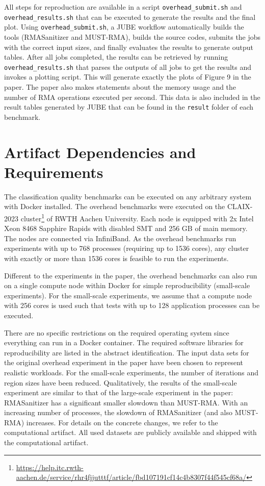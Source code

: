 \documentclass[twoside]{article}
\begin{document}
All steps for reproduction are available in a script \texttt{overhead\_submit.sh} and \texttt{overhead\_results.sh} that can be executed to generate the results and the final plot.
Using \texttt{overhead\_submit.sh}, a JUBE workflow automatically builds the tools (RMASanitizer and MUST-RMA), builds the source codes, submits the jobs with the correct input sizes, and finally evaluates the results to generate output tables.
After all jobs completed, the results can be retrieved by running \texttt{overhead\_results.sh} that parses the outputs of all jobs to get the results and invokes a plotting script.
This will generate exactly the plots of Figure 9 in the paper.
The paper also makes statements about the memory usage and the number of RMA operations executed per second.
This data is also included in the result tables generated by JUBE that can be found in the \texttt{result} folder of each benchmark.



\section*{Artifact Dependencies and Requirements}

The classification quality benchmarks can be executed on any arbitrary system with Docker installed.
The overhead benchmarks were executed on the CLAIX-2023 cluster\footnote{\url{https://help.itc.rwth-aachen.de/service/rhr4fjjutttf/article/fbd107191cf14c4b8307f44f545cf68a/}} of RWTH Aachen University. Each node is equipped with 2x Intel Xeon 8468 Sapphire Rapids with disabled SMT and 256 GB of main memory. The nodes are connected via InfiniBand. As the overhead benchmarks run experiments with up to 768 processes (requiring up to 1536 cores), any cluster with exactly or more than 1536 cores is feasible to run the experiments.

Different to the experiments in the paper, the overhead benchmarks can also run on a single compute node within Docker for simple reproducibility (small-scale experiments).
For the small-scale experiments, we assume that a compute node with 256 cores is used such that tests with up to 128 application processes can be executed.

There are no specific restrictions on the required operating system since everything can run in a Docker container. The required software libraries for reproducibility are listed in the abstract identification.
The input data sets for the original overhead experiment in the paper have been chosen to represent realistic workloads.
For the small-scale experiments, the number of iterations and region sizes have been reduced.
Qualitatively, the results of the small-scale experiment are similar to that of the large-scale experiment in the paper: RMASanitizer has a significant smaller slowdown than MUST-RMA. With an increasing number of processes, the slowdown of RMASanitizer (and also MUST-RMA) increases.
For details on the concrete changes, we refer to the computational artifact.
All used datasets are publicly available and shipped with the computational artifact.
\end{document}
